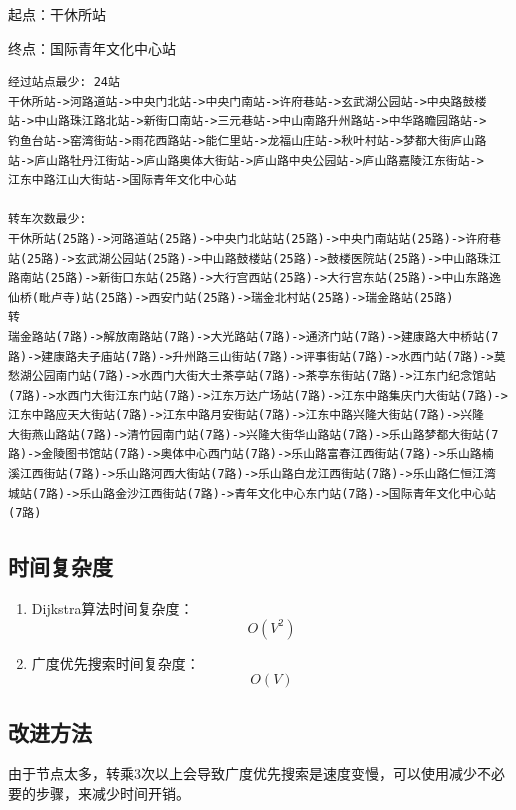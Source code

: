 \documentclass[a4paper,11pt,UTF8]{ctexart}
\begin{document}
起点：干休所站 \par
终点：国际青年文化中心站
\begin{lstlisting}[caption=测试用例2,captionpos=b]
经过站点最少: 24站
干休所站->河路道站->中央门北站->中央门南站->许府巷站->玄武湖公园站->中央路鼓楼
站->中山路珠江路北站->新街口南站->三元巷站->中山南路升州路站->中华路瞻园路站->
钓鱼台站->窑湾街站->雨花西路站->能仁里站->龙福山庄站->秋叶村站->梦都大街庐山路
站->庐山路牡丹江街站->庐山路奥体大街站->庐山路中央公园站->庐山路嘉陵江东街站->
江东中路江山大街站->国际青年文化中心站

转车次数最少:
干休所站(25路)->河路道站(25路)->中央门北站站(25路)->中央门南站站(25路)->许府巷
站(25路)->玄武湖公园站(25路)->中山路鼓楼站(25路)->鼓楼医院站(25路)->中山路珠江
路南站(25路)->新街口东站(25路)->大行宫西站(25路)->大行宫东站(25路)->中山东路逸
仙桥(毗卢寺)站(25路)->西安门站(25路)->瑞金北村站(25路)->瑞金路站(25路)
转
瑞金路站(7路)->解放南路站(7路)->大光路站(7路)->通济门站(7路)->建康路大中桥站(7
路)->建康路夫子庙站(7路)->升州路三山街站(7路)->评事街站(7路)->水西门站(7路)->莫
愁湖公园南门站(7路)->水西门大街大士茶亭站(7路)->茶亭东街站(7路)->江东门纪念馆站
(7路)->水西门大街江东门站(7路)->江东万达广场站(7路)->江东中路集庆门大街站(7路)->江东中路应天大街站(7路)->江东中路月安街站(7路)->江东中路兴隆大街站(7路)->兴隆
大街燕山路站(7路)->清竹园南门站(7路)->兴隆大街华山路站(7路)->乐山路梦都大街站(7路)->金陵图书馆站(7路)->奥体中心西门站(7路)->乐山路富春江西街站(7路)->乐山路楠
溪江西街站(7路)->乐山路河西大街站(7路)->乐山路白龙江西街站(7路)->乐山路仁恒江湾
城站(7路)->乐山路金沙江西街站(7路)->青年文化中心东门站(7路)->国际青年文化中心站
(7路)
\end{lstlisting}

\subsection{时间复杂度}
\begin{enumerate}
   \item Dijkstra算法时间复杂度：$$O(V^2)$$
   \item 广度优先搜索时间复杂度：$$O(V)$$
\end{enumerate}\par

\subsection{改进方法}
由于节点太多，转乘3次以上会导致广度优先搜索是速度变慢，可以使用减少不必要的步骤，来减少时间开销。
\end{document}
